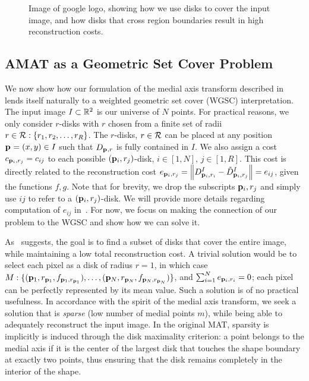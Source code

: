 \documentclass[10pt,twocolumn,letterpaper]{article}
\begin{document}
\begin{figure}[ht]
\caption{Image of google logo, showing how we use disks to cover the input image, and how disks that cross region boundaries result
in high reconstruction costs.}
\label{fig:google}
\end{figure}


\subsection{AMAT as a Geometric Set Cover Problem}\label{sec:amat-wgsc}
We now show how our formulation of the medial axis transform described in~ lends itself naturally to a 
weighted geometric set cover (WGSC) interpretation.
The input image $I\subset\mathbb{R}^2$ is our universe of $N$ points.
For practical reasons, we only consider $r$-disks with $r$ chosen from a finite set of radii $r\in\mathcal{R}:\{r_1,r_2,\ldots,r_R\}$.
The $r$-disks, $r\in\mathcal{R}$ can be placed at any position $\mathbf{p}_{}=(x,y)\in I$ such that $D_{\mathbf{p}_{},r}$ is fully contained in $I$.
We also assign a cost $c_{\mathbf{p}_{i},r_j} = c_{ij}$ to each possible $(\mathbf{p}_{i},r_j)$-disk, $i\in[1,N],\, j\in[1,R]$.
This cost is directly related to the reconstruction cost 
$e_{\mathbf{p}_{i},r_j}=\left \lVert D_{\mathbf{p}_{i},r_i}^I - \tilde{D}_{\mathbf{p}_{i},r_j}^I \right \rVert = e_{ij}$, given the functions $f,g$.
Note that for brevity, we drop the subscripts $\mathbf{p}_{i},r_j$ and simply use $ij$ to refer to a $(\mathbf{p}_{i},r_j)$-disk.
We will provide more details regarding computation of $e_{ij}$ in~.
For now, we focus on making the connection of our problem to the WGSC and show how we can solve it.

As~ suggests, the goal is to find a subset of disks that cover the entire image, while maintaining
a low total reconstruction cost. 
A trivial solution would be to select each pixel as a disk of radius $r=1$, in which case
$M:\{ (\mathbf{p}_{1},r_{\mathbf{p}_{1}},f_{\mathbf{p}_{1},r_{\mathbf{p}_{1}}}), \ldots, ( \mathbf{p}_{N},r_{\mathbf{p}_{N}},f_{\mathbf{p}_{N},r_{\mathbf{p}_{N}}} ) \}$,
and $\sum_{i=1}^N e_{\mathbf{p}_{i},r_i} = 0$; each pixel can be perfectly represented by its mean value.
Such a solution is of no practical usefulness. 
In accordance with the spirit of the medial axis transform, we seek a solution that is \emph{sparse}
(low number of medial points $m$), while being able to adequately reconstruct the input image.
In the original MAT, sparsity is implicitly is induced through the disk maximality criterion:
a point belongs to the medial axis if it is the center of the largest disk that touches 
the shape boundary at exactly two points, thus ensuring that the disk remains completely in the 
interior of the shape.
\end{document}
